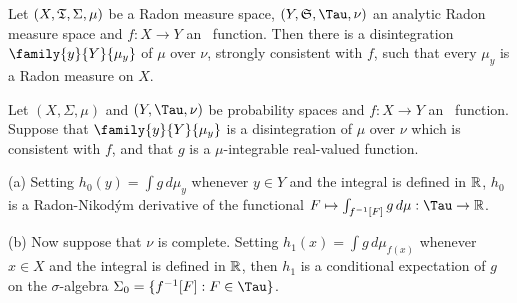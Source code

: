  Let
$(X,\frak T,\Sigma,\mu)$ be a Radon measure space,
$(Y,\frak S,\Tau,\nu)$ an analytic Radon measure space and $f:X\to Y$ an
\imp\ function.   Then there is a disintegration $\family{y}{Y}{\mu_y}$
of $\mu$ over $\nu$, strongly consistent with $f$, such that every
$\mu_y$ is a Radon measure on $X$.


 Let $(X,\Sigma,\mu)$ and $(Y,\Tau,\nu)$ be
probability spaces and $f:X\to Y$ an \imp\ function.   Suppose that
$\family{y}{Y}{\mu_y}$ is a disintegration of $\mu$ over $\nu$ which is
consistent with $f$, and that $g$ is a $\mu$-integrable real-valued
function.

(a) Setting $h_0(y)=\int g\,d\mu_y$ whenever $y\in Y$ and the integral
is defined in
$\Bbb R$, $h_0$ is a Radon-Nikod\'ym derivative of the functional
$F\mapsto\int_{f^{-1}[F]}g\,d\mu:\Tau\to\Bbb R$.

(b) Now suppose that $\nu$ is complete.   Setting
$h_1(x)=\int g\,d\mu_{f(x)}$ whenever $x\in X$ and the integral is
defined in $\Bbb R$, then
$h_1$ is a conditional expectation of $g$ on the $\sigma$-algebra
$\Sigma_0=\{f^{-1}[F]:F\in\Tau\}$.

